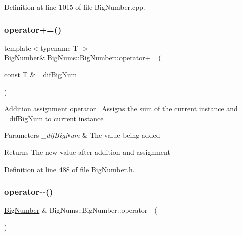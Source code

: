 Definition at line 1015 of file Big\+Number.\+cpp.

\mbox{\label{class_big_nums_1_1_big_number_a99a14e0f44f08f04dd686a8fb1251338}} 
\subsubsection{\texorpdfstring{operator+=()}{operator+=()}}
{\footnotesize\ttfamily template$<$typename T $>$ \\
\mbox{\hyperlink{class_big_nums_1_1_big_number}{Big\+Number}}\& Big\+Nums\+::\+Big\+Number\+::operator+= (\begin{DoxyParamCaption}\item[{const T \&}]{\+\_\+dif\+Big\+Num }\end{DoxyParamCaption})\hspace{0.3cm}{\ttfamily [inline]}}

Addition assignment operator~\newline
Assigns the sum of the current instance and \+\_\+dif\+Big\+Num to current instance 
\begin{DoxyParams}{Parameters}
{\em \+\_\+dif\+Big\+Num} & The value being added \\
\hline
\end{DoxyParams}
\begin{DoxyReturn}{Returns}
The new value after addition and assignment 
\end{DoxyReturn}


Definition at line 488 of file Big\+Number.\+h.

\mbox{\label{class_big_nums_1_1_big_number_ada3ed05861f520f73182e42c9fb153cb}} 
\subsubsection{\texorpdfstring{operator-\/-\/()}{operator--()}\hspace{0.1cm}{\footnotesize\ttfamily [1/2]}}
{\footnotesize\ttfamily \mbox{\hyperlink{class_big_nums_1_1_big_number}{Big\+Number}} \& Big\+Nums\+::\+Big\+Number\+::operator-\/-\/ (\begin{DoxyParamCaption}{ }\end{DoxyParamCaption})}

